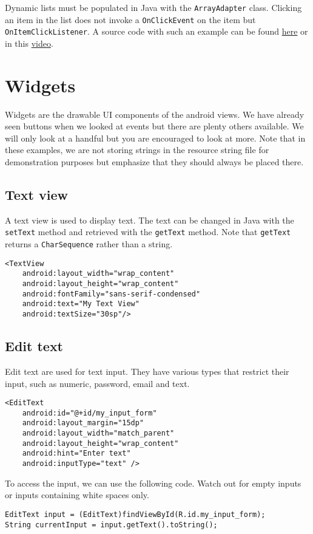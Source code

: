 Dynamic lists must be populated in Java with the \texttt{ArrayAdapter} class. Clicking an item in the list does not invoke a \texttt{OnClickEvent} on the item but \texttt{OnItemClickListener}. A source code with such an example can be found \href{https://github.com/JonSteinn/AndroidDevelopment/tree/master/examples/lab1/list}{here} or in this \href{https://youtu.be/cyOHd-txvu4}{video}.

\section{Widgets}
Widgets are the drawable UI components of the android views. We have already seen buttons when we looked at events but there are plenty others available. We will only look at a handful but you are encouraged to look at more. Note that in these examples, we are not storing strings in the resource string file for demonstration purposes but emphasize that they should always be placed there.

\subsection{Text view}
A text view is used to display text. The text can be changed in Java with the \texttt{setText} method and retrieved with the \texttt{getText} method. Note that \texttt{getText} returns a \texttt{CharSequence} rather than a string.
\begin{lstlisting}[style=A_XML]
<TextView
    android:layout_width="wrap_content"
    android:layout_height="wrap_content"
    android:fontFamily="sans-serif-condensed"
    android:text="My Text View"
    android:textSize="30sp"/>
\end{lstlisting}

\subsection{Edit text}
Edit text are used for text input. They have various types that restrict their input, such as numeric, password, email and text. 
\begin{lstlisting}[style=A_XML, caption={Edit text declaration}, label = {listing:edittext}]
<EditText
    android:id="@+id/my_input_form"
    android:layout_margin="15dp"
    android:layout_width="match_parent"
    android:layout_height="wrap_content"
    android:hint="Enter text"
    android:inputType="text" />
\end{lstlisting}
To access the input, we can use the following code. Watch out for empty inputs or inputs containing white spaces only.
\begin{lstlisting}[style=A_Java]
EditText input = (EditText)findViewById(R.id.my_input_form);
String currentInput = input.getText().toString();
\end{lstlisting}

